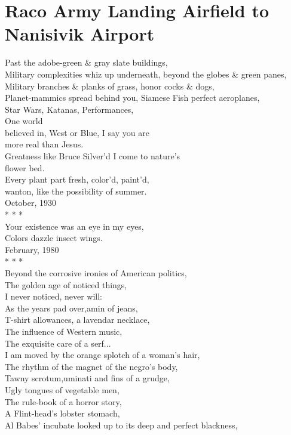 \documentclass[smalldemyvopaper,11pt,twoside,onecolumn,openright,extrafontsizes]{memoir}
\begin{document}
\chapter{Raco Army Landing Airfield to Nanisivik Airport}
Past the adobe-green \& gray slate buildings,
\\Military complexities whiz up underneath, beyond the globes \& green panes,
\\Military branches \& planks of grass, honor cocks \& dogs,
\\Planet-mammics spread behind you, Siamese Fish perfect aeroplanes,
\\Star Wars, Katanas, Performances,
\\One world
\\believed in, West or Blue, I say you are
\\more real than Jesus.
\\Greatness like Bruce Silver'd I come to nature's
\\flower bed.
\\Every plant part fresh, color'd, paint'd,
\\wanton, like the possibility of summer.
\\October, 1930
\\*   *   *
\\Your existence was an eye in my eyes,
\\Colors dazzle insect wings.
\\February, 1980
\\*   *   *
\\Beyond the corrosive ironies of American politics,
\\The golden age of noticed things,
\\I never noticed, never will:
\\As the years pad over,amin of jeans,
\\T-shirt allowances, a lavendar necklace,
\\The influence of Western music,
\\The exquisite care of a serf...
\\I am moved by the orange splotch of a woman's hair,
\\The rhythm of the magnet of the negro's body,
\\Tawny scrotum,uminati and fins of a grudge,
\\Ugly tongues of vegetable men,
\\The rule-book of a horror story,
\\A Flint-head's lobster stomach,
\\Al Babes' incubate looked up to its deep and perfect blackness,
\end{document}
